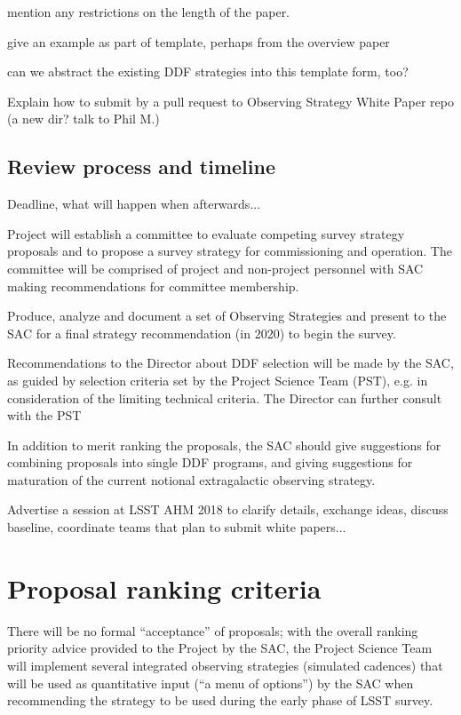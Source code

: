 \documentclass[DM,lsstdraft,toc,usenatbib]{lsstdoc}
\begin{document}
mention any restrictions on the length of the paper. 

give an example as part of template, perhaps from the overview paper

can we abstract the existing DDF strategies into this template form, too? 


Explain how to submit by a pull request to Observing Strategy White Paper repo
(a new dir? talk to Phil M.) 




\subsection{Review process and timeline}

Deadline, what will happen when afterwards...

Project will establish a committee to evaluate competing survey strategy proposals and to propose 
a survey strategy for commissioning and operation. The committee will be comprised of project and 
non-project personnel with SAC making recommendations for committee membership. 

Produce, analyze and document a set of Observing Strategies and present to 
the SAC for a final strategy recommendation (in 2020) to begin the survey.

Recommendations to the Director about DDF selection will be made by the SAC, as guided by selection criteria set by the Project Science Team (PST), e.g. in consideration of the limiting technical criteria. The Director can further consult with the PST

In addition to merit ranking the proposals, the SAC should give suggestions for combining proposals into single DDF programs, and giving suggestions for maturation of the current notional extragalactic observing strategy.


Advertise a session at LSST AHM 2018 to clarify details, exchange ideas, discuss baseline,
coordinate teams that plan to submit white papers... 


\section{Proposal ranking criteria} 

There will be no formal ``acceptance'' of proposals; with the overall ranking priority 
advice provided to the Project by the SAC, the Project Science Team will implement several 
integrated observing strategies (simulated cadences) that will be used as quantitative input
(``a menu of options'') by the SAC when recommending the strategy to be used during the 
early phase of LSST survey. 
\end{document}

